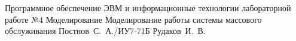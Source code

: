 \documentclass{bmstu}
\begin{document}
	
	{Программное обеспечение ЭВМ и информационные технологии}
	{лабораторной работе №4}
	{Моделирование}
	{Моделирование работы системы массового обслуживания}
	{}
	{Постнов~С.~А./ИУ7-71Б}
	{Рудаков~И.~В.}
	
	\maketableofcontents
	
	
	
	
	
\end{document}

